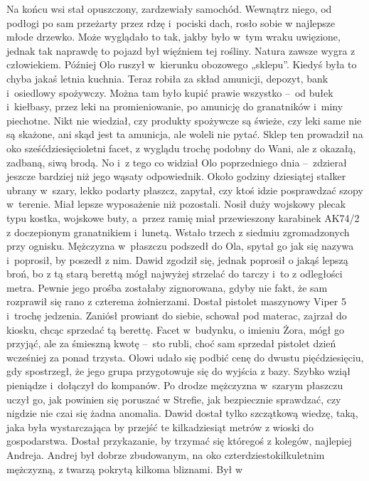 \documentclass[../MAIN.tex]{subfiles}
\begin{document}
Na końcu wsi stał opuszczony, zardzewiały samochód. Wewnątrz
niego, od podłogi po sam przeżarty przez rdzę i~pociski dach, rosło sobie w
najlepsze młode drzewko. Może wyglądało to
tak,
jakby było w~tym wraku uwięzione, jednak tak naprawdę to pojazd był więźniem tej
rośliny. Natura zawsze wygra z człowiekiem.
\pp
Później Olo ruszył w~kierunku obozowego „sklepu”. Kiedyś była to chyba jakaś
letnia kuchnia. Teraz robiła za skład amunicji, depozyt, bank i~osiedlowy
spożywczy. Można tam było kupić prawie wszystko --~od bułek i~kiełbasy, przez
leki na promieniowanie, po amunicję do granatników i~miny piechotne.
Nikt nie wiedział, czy produkty spożywcze są świeże, czy leki same nie są skażone, ani
skąd jest ta amunicja, ale woleli nie pytać. Sklep ten prowadził na oko
sześćdziesięcioletni facet, z wyglądu trochę podobny do Wani, ale z okazałą,
zadbaną, siwą brodą. No i~z tego co widział Olo poprzedniego dnia --~zdzierał
jeszcze bardziej niż jego wąsaty odpowiednik.
\pp
Około godziny dziesiątej stalker ubrany w~szary, lekko podarty płaszcz, zapytał,
czy ktoś idzie posprawdzać szopy w~terenie. Miał lepsze wyposażenie niż
pozostali. Nosił duży wojskowy plecak typu kostka, wojskowe buty, a~przez ramię
miał przewieszony karabinek AK74/2 z doczepionym granatnikiem i~lunetą. Wstało
trzech z siedmiu zgromadzonych przy ognisku.
Mężczyzna w~płaszczu podszedł do
Ola, spytał go jak się nazywa i~poprosił, by poszedł z nim. Dawid zgodził się,
jednak poprosił o jakąś lepszą broń, bo z tą starą berettą mógł najwyżej
strzelać do tarczy i~to z odległości metra. Pewnie jego prośba zostałaby
zignorowana, gdyby nie fakt, że sam rozprawił się rano z czterema żołnierzami.
Dostał pistolet maszynowy Viper 5 i~trochę jedzenia.
Zaniósł prowiant do siebie, schował pod materac, zajrzał do kiosku, chcąc
sprzedać tą berettę. Facet w~budynku, o imieniu Żora, mógł go przyjąć, ale za
śmieszną kwotę --~sto rubli, choć sam sprzedał pistolet dzień wcześniej za
ponad trzysta. Olowi udało się podbić cenę do dwustu pięćdziesięciu, gdy
spostrzegł, że jego grupa przygotowuje się do wyjścia z bazy. Szybko wziął
pieniądze i~dołączył do kompanów.
\pp
Po drodze mężczyzna w~szarym płaszczu uczył go, jak powinien się poruszać w
Strefie, jak bezpiecznie sprawdzać, czy nigdzie nie czai się żadna anomalia.
Dawid dostał tylko szczątkową wiedzę, taką, jaka była wystarczająca by przejść
te kilkadziesiąt metrów z wioski do gospodarstwa.
Dostał przykazanie, by trzymać
się któregoś z kolegów, najlepiej Andreja. Andrej był dobrze zbudowanym, na oko
czterdziestokilkuletnim mężczyzną, z twarzą pokrytą kilkoma bliznami. Był w
\end{document}
